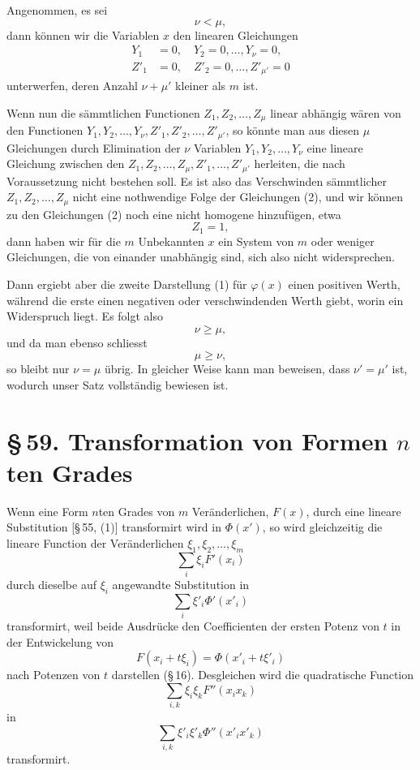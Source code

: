 \documentclass[11pt]{article}
\newcommand{\sect}[2]{\section*{\S\,#1. #2}}
\begin{document}
Angenommen, es sei
\[
 \nu<\mu,
\]
dann können wir die Variablen $x$ den linearen Gleichungen
\begin{equation}
\begin{aligned}
 Y_1&=0,\quad Y_2=0,\ldots,Y_\nu=0,\\
 Z'_1&=0,\quad Z'_2=0,\ldots,Z'_{\mu'}=0
\end{aligned}
\tag{2}
\end{equation}
unterwerfen, deren Anzahl $\nu+\mu'$ kleiner als $m$ ist.

Wenn nun die sämmtlichen Functionen $Z_1,Z_2,\ldots,Z_\mu$ linear abhängig wären von den Functionen $Y_1,Y_2,\ldots,Y_\nu,Z'_1,Z'_2,\ldots,Z'_{\mu'}$, so könnte man aus diesen $\mu$ Gleichungen durch Elimination der $\nu$ Variablen $Y_1,Y_2,\ldots,Y_\nu$ eine lineare Gleichung zwischen den $Z_1,Z_2,\ldots,Z_\mu,Z'_1,\ldots,Z'_{\mu'}$ herleiten, die nach Voraussetzung nicht bestehen soll. Es ist also das Verschwinden sämmtlicher $Z_1,Z_2,\ldots,Z_\mu$ nicht eine nothwendige Folge der Gleichungen (2), und wir können zu den Gleichungen (2) noch eine nicht homogene hinzufügen, etwa
\[
 Z_1=1,
\]
dann haben wir für die $m$ Unbekannten $x$ ein System von $m$ oder weniger Gleichungen, die von einander unabhängig sind, sich also nicht widersprechen.

Dann ergiebt aber die zweite Darstellung (1) für $\varphi(x)$ einen positiven Werth, während die erste einen negativen oder verschwindenden Werth giebt, worin ein Widerspruch liegt. Es folgt also
\[
 \nu\geq \mu,
\]
und da man ebenso schliesst
\[
 \mu\geq \nu,
\]
so bleibt nur $\nu=\mu$ übrig. In gleicher Weise kann man beweisen, dass $\nu'=\mu'$ ist, wodurch unser Satz vollständig bewiesen ist.

\sect{59}{Transformation von Formen $n$ten Grades}

Wenn eine Form $n$ten Grades von $m$ Veränderlichen, $F(x)$, durch eine lineare Substitution [\S\,55, (1)] transformirt wird in $\Phi(x')$, so wird gleichzeitig die lineare Function der Veränderlichen $\xi_1,\xi_2,\ldots,\xi_m$
\begin{equation}
 \sum_i \xi_i F'(x_i)
\tag{1}
\end{equation}
durch dieselbe auf $\xi_i$ angewandte Substitution in
\begin{equation}
 \sum_i \xi'_i\Phi'(x'_i)
\tag{2}
\end{equation}
transformirt, weil beide Ausdrücke den Coefficienten der ersten Potenz von $t$ in der Entwickelung von
\[
 F(x_i+t\xi_i)=\Phi(x'_i+t\xi'_i)
\]
nach Potenzen von $t$ darstellen (\S\,16). Desgleichen wird die quadratische Function
\begin{equation}
 \sum_{i,k}\xi_i\xi_k F''(x_i x_k)
\tag{3}
\end{equation}
in
\begin{equation}
 \sum_{i,k}\xi'_i\xi'_k\Phi''(x'_i x'_k)
\tag{4}
\end{equation}
transformirt.
\end{document}
